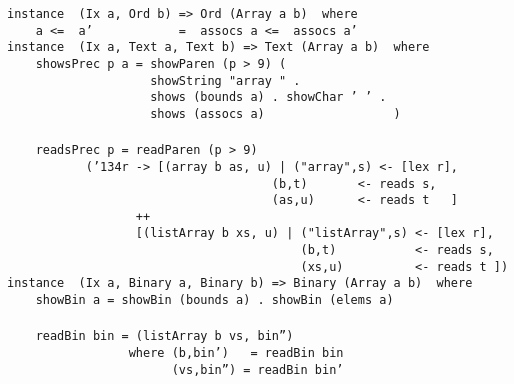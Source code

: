 \eprogB\noindent\bprogB
\mbox{\tt instance\ \ (Ix\ a,\ Ord\ b)\ =>\ Ord\ (Array\ a\ b)\ \ where}\\
\mbox{\tt \ \ \ \ a\ <=\ \ a'\ \ \ \ \ \ \ \ \ \ \ \ =\ \ assocs\ a\ <=\ \ assocs\ a'}
\eprogB\noindent\bprogB
\mbox{\tt instance\ \ (Ix\ a,\ Text\ a,\ Text\ b)\ =>\ Text\ (Array\ a\ b)\ \ where}\\
\mbox{\tt \ \ \ \ showsPrec\ p\ a\ =\ showParen\ (p\ >\ 9)\ (}\\
\mbox{\tt \ \ \ \ \ \ \ \ \ \ \ \ \ \ \ \ \ \ \ \ showString\ "array\ "\ .}\\
\mbox{\tt \ \ \ \ \ \ \ \ \ \ \ \ \ \ \ \ \ \ \ \ shows\ (bounds\ a)\ .\ showChar\ '\ '\ .}\\
\mbox{\tt \ \ \ \ \ \ \ \ \ \ \ \ \ \ \ \ \ \ \ \ shows\ (assocs\ a)\ \ \ \ \ \ \ \ \ \ \ \ \ \ \ \ \ \ )}\\
\mbox{\tt }\\
\mbox{\tt \ \ \ \ readsPrec\ p\ =\ readParen\ (p\ >\ 9)}\\
\mbox{\tt \ \ \ \ \ \ \ \ \ \ \ ({\char'134}r\ ->\ [(array\ b\ as,\ u)\ |\ ("array",s)\ <-\ [lex\ r],}\\
\mbox{\tt \ \ \ \ \ \ \ \ \ \ \ \ \ \ \ \ \ \ \ \ \ \ \ \ \ \ \ \ \ \ \ \ \ \ \ \ \ (b,t)\ \ \ \ \ \ \ <-\ reads\ s,}\\
\mbox{\tt \ \ \ \ \ \ \ \ \ \ \ \ \ \ \ \ \ \ \ \ \ \ \ \ \ \ \ \ \ \ \ \ \ \ \ \ \ (as,u)\ \ \ \ \ \ <-\ reads\ t\ \ \ ]}\\
\mbox{\tt \ \ \ \ \ \ \ \ \ \ \ \ \ \ \ \ \ \ ++}\\
\mbox{\tt \ \ \ \ \ \ \ \ \ \ \ \ \ \ \ \ \ \ [(listArray\ b\ xs,\ u)\ |\ ("listArray",s)\ <-\ [lex\ r],}\\
\mbox{\tt \ \ \ \ \ \ \ \ \ \ \ \ \ \ \ \ \ \ \ \ \ \ \ \ \ \ \ \ \ \ \ \ \ \ \ \ \ \ \ \ \ (b,t)\ \ \ \ \ \ \ \ \ \ \ <-\ reads\ s,}\\
\mbox{\tt \ \ \ \ \ \ \ \ \ \ \ \ \ \ \ \ \ \ \ \ \ \ \ \ \ \ \ \ \ \ \ \ \ \ \ \ \ \ \ \ \ (xs,u)\ \ \ \ \ \ \ \ \ \ <-\ reads\ t\ ])}
\eprogB\noindent\bprogB
\mbox{\tt instance\ \ (Ix\ a,\ Binary\ a,\ Binary\ b)\ =>\ Binary\ (Array\ a\ b)\ \ where}\\
\mbox{\tt \ \ \ \ showBin\ a\ =\ showBin\ (bounds\ a)\ .\ showBin\ (elems\ a)}\\
\mbox{\tt }\\
\mbox{\tt \ \ \ \ readBin\ bin\ =\ (listArray\ b\ vs,\ bin'')}\\
\mbox{\tt \ \ \ \ \ \ \ \ \ \ \ \ \ \ \ \ \ where\ (b,bin')\ \ \ =\ readBin\ bin}\\
\mbox{\tt \ \ \ \ \ \ \ \ \ \ \ \ \ \ \ \ \ \ \ \ \ \ \ (vs,bin'')\ =\ readBin\ bin'}
\eprogB
